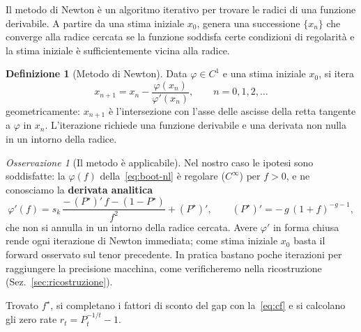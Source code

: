 \documentclass[11pt,a4paper]{article}
\theoremstyle{plain}
\theoremstyle{definition}
\newtheorem{definizione}[teorema]{Definizione}
\theoremstyle{remark}
\newtheorem*{osservazione}{Osservazione}
\newcommand{\FSP}{\mathrm{FSP}}
\begin{document}
Il metodo di Newton \`e un algoritmo iterativo per trovare le radici di una funzione derivabile. A
partire da una stima iniziale $x_0$, genera una successione $\{x_n\}$ che converge alla radice
cercata se la funzione soddisfa certe condizioni di regolarit\`a e la stima iniziale \`e
sufficientemente vicina alla radice.

\begin{definizione}[Metodo di Newton]
Data $\varphi\in C^1$ e una stima iniziale $x_0$, si itera
\begin{equation}
  \label{eq:newton}
  x_{n+1} = x_n - \frac{\varphi(x_n)}{\varphi'(x_n)}, \qquad n=0,1,2,\ldots
\end{equation}
geometricamente: $x_{n+1}$ \`e l'intersezione con l'asse delle ascisse della retta tangente a
$\varphi$ in $x_n$. L'iterazione richiede una funzione derivabile e una derivata non nulla in un
intorno della radice.
\end{definizione}

\begin{osservazione}[Il metodo \`e applicabile]
Nel nostro caso le ipotesi sono soddisfatte: la $\varphi(f)$ della~\eqref{eq:boot-nl} \`e regolare
($C^\infty$) per $f>0$, e ne conosciamo la \textbf{derivata analitica}
\begin{equation}
  \label{eq:boot-nl-der}
  \varphi'(f) = s_{k}\,\frac{-\,(P^\star)'\,f - (1 - P^\star)}{f^2} + (P^\star)',
  \qquad (P^\star)' = -\,g\,(1+f)^{-g-1},
\end{equation}
che non si annulla in un intorno della radice cercata. Avere $\varphi'$ in forma chiusa rende ogni
iterazione di Newton immediata; come stima iniziale $x_0$ basta il forward osservato sul tenor
precedente. In pratica bastano poche iterazioni per raggiungere la precisione macchina, come
verificheremo nella ricostruzione (Sez.~\ref{sec:ricostruzione}).
\end{osservazione}

Trovato $f^\star$, si completano i fattori di sconto del gap con la~\eqref{eq:cf} e si calcolano
gli zero rate $r_t=P_t^{-1/t}-1$.

\end{document}

